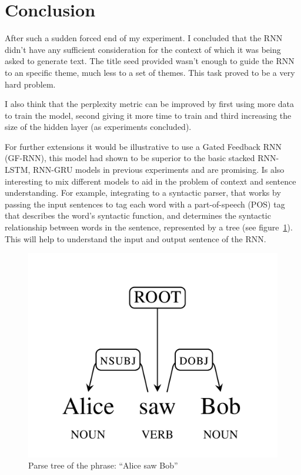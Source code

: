 \documentclass{article} %
\begin{document}
\section{Conclusion}
After such a sudden forced end of my experiment. I concluded that the RNN didn't
have any sufficient consideration for the context of which it was being asked to
generate text. The title seed provided wasn't enough to guide the RNN to an
specific theme, much less to a set of themes. This task proved to be a very hard
problem.

I also think that the perplexity metric can be improved by first using more
data to train the model, second giving it more time to train and third
increasing the size of the hidden layer (as experiments concluded).

For further extensions it would be illustrative to use a Gated Feedback RNN (GF-RNN),
this model had shown to be superior to the basic stacked RNN-LSTM, RNN-GRU
models in previous experiments and are promising. Is also interesting to mix
different models to aid in the problem of context and sentence understanding.
For example, integrating to a syntactic parser, that works by passing the input
sentences to tag each word with a part-of-speech (POS) tag that describes the
word's syntactic function, and determines the syntactic relationship between
words in the sentence, represented by a tree (see figure~\ref{fig:parsetree}).
This will help to understand the input and output sentence of the RNN.

\begin{figure}[h]
\centering
\includegraphics[scale=0.1]{parse_tree}
\caption{Parse tree of the phrase: ``Alice saw Bob''}
\label{fig:parsetree}
\end{figure}
\end{document}
